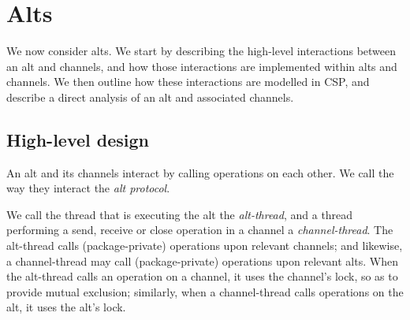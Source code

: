 \section{Alts}
\label{sec:alt}

\inlineScala

We now consider alts.  We start by describing the high-level interactions
between an alt and channels, and how those interactions are implemented within
alts and channels.  We then outline how these interactions are modelled in
CSP, and describe a direct analysis of an alt and associated channels.


\subsection{High-level design}

An alt and its channels interact by calling operations on each other.  We call
the way they interact the \emph{alt protocol}.

We call the thread that is executing the alt the \emph{alt-thread}, and a
thread performing a send, receive or close operation in a channel a
\emph{channel-thread}.  The alt-thread calls (package-private) operations upon
relevant channels; and likewise, a channel-thread may call (package-private)
operations upon relevant alts.
When the alt-thread calls an operation on a channel, it uses the channel's
lock, so as to provide mutual exclusion; similarly, when a channel-thread
calls operations on the alt, it uses the alt's lock.

